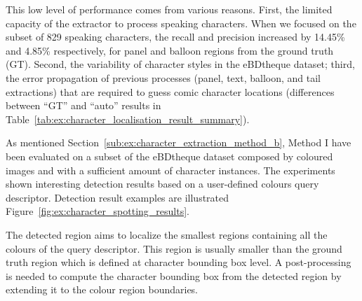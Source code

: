 This low level of performance comes from various reasons.
First, the limited capacity of the extractor to process speaking characters.
When we focused on the subset of 829 speaking characters, the recall and precision increased by 14.45\% and 4.85\% respectively, for panel and balloon regions from the ground truth (GT).
Second, the variability of character styles in the eBDtheque dataset; third, the error propagation of previous processes (panel, text, balloon, and tail extractions) that are required to guess comic character locations (differences between ``GT'' and ``auto'' results in Table~\ref{tab:ex:character_localisation_result_summary}).





As mentioned Section~\ref{sub:ex:character_extraction_method_b}, Method I have been evaluated on a subset of the eBDtheque dataset composed by coloured images and with a sufficient amount of character instances.
The experiments shown interesting detection results based on a user-defined colours query descriptor.
Detection result examples are illustrated Figure~\ref{fig:ex:character_spotting_results}.

The detected region aims to localize the smallest regions containing all the colours of the query descriptor.
This region is usually smaller than the ground truth region which is defined at character bounding box level.
A post-processing is needed to compute the character bounding box from the detected region by extending it to the colour region boundaries.

